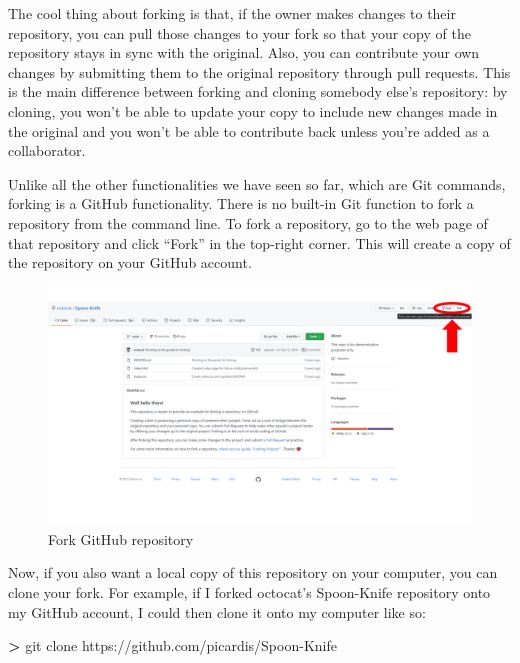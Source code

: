 \documentclass[
]{book}
\newenvironment{Shaded}{\begin{snugshade}}{\end{snugshade}}
\newcommand{\ExtensionTok}[1]{#1}
\newcommand{\NormalTok}[1]{#1}
\newcommand{\OperatorTok}[1]{\textcolor[rgb]{0.81,0.36,0.00}{\textbf{#1}}}
\begin{document}
The cool thing about forking is that, if the owner makes changes to their repository, you can pull those changes to your fork so that your copy of the repository stays in sync with the original. Also, you can contribute your own changes by submitting them to the original repository through pull requests. This is the main difference between forking and cloning somebody else's repository: by cloning, you won't be able to update your copy to include new changes made in the original and you won't be able to contribute back unless you're added as a collaborator.

Unlike all the other functionalities we have seen so far, which are Git commands, forking is a GitHub functionality. There is no built-in Git function to fork a repository from the command line. To fork a repository, go to the web page of that repository and click ``Fork'' in the top-right corner. This will create a copy of the repository on your GitHub account.

\begin{figure}

{\centering \includegraphics[width=1\linewidth]{img/github-03} 

}

\caption{Fork GitHub repository}\label{fig:github03}
\end{figure}

Now, if you also want a local copy of this repository on your computer, you can clone your fork. For example, if I forked octocat's Spoon-Knife repository onto my GitHub account, I could then clone it onto my computer like so:

\begin{Shaded}
\begin{Highlighting}[]
\OperatorTok{\textgreater{}}\NormalTok{ git }\ExtensionTok{clone}\NormalTok{ https://github.com/picardis/Spoon{-}Knife}
\end{Highlighting}
\end{Shaded}
\end{document}
